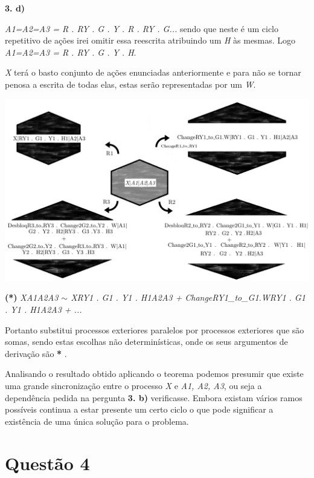 \documentclass[11pt,a4paper]{report}
\begin{document}
\textbf{3. d)}

\emph{A1=A2=A3 = R . RY . G . Y . R . RY . G...} sendo que neste é um ciclo repetitivo de ações irei omitir essa reescrita atribuindo um \emph{H} às mesmas. Logo \emph{A1=A2=A3 = R . RY . G . Y . H}.

\emph{X} terá o basto conjunto de ações enunciadas anteriormente e para não se tornar penosa a escrita de todas elas, estas serão representadas por um \emph{W}.

\begin{minipage}{0.75\linewidth}
        \centering
		\includegraphics[width=\textwidth]{Ex34.jpeg}\par\vspace{1cm}
\end{minipage}

\textbf{(*)} \emph{X\textbar A1\textbar A2\textbar A3 $\sim$ X\textbar RY1 . G1 . Y1 . H1\textbar A2\textbar A3 + ChangeRY1\_to\_G1.W\textbar RY1 . G1 . Y1 . H1\textbar A2\textbar A3 + ... }

Portanto substitui processos exteriores paralelos por processos exteriores que são somas, sendo estas escolhas não determinísticas, onde os seus argumentos de derivação são \textbf{*} .

Analisando o resultado obtido aplicando o teorema podemos presumir que existe uma grande sincronização entre o processo \emph{X} e \emph{A1, A2, A3}, ou seja a dependência pedida na pergunta \textbf{3. b)} verificasse. Embora existam vários ramos possíveis continua a estar presente um certo ciclo o que pode significar a existência de uma única solução para o problema.

\section{Questão 4}
\end{document}
